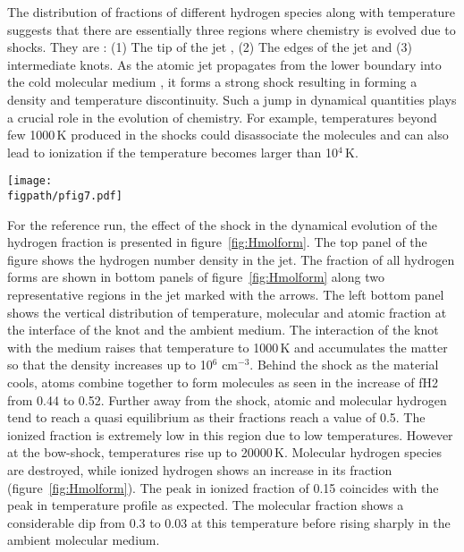 \documentclass[useAMS,usenatbib]{mn2e}
\newcommand{\figpath}{/home/phybva/SiOJets_New/PAPER/NEWFIGS}
\begin{document}
The distribution of fractions of different hydrogen species along with
temperature suggests that there are essentially three regions where
chemistry is evolved due to shocks.
They are : (1) The tip of the jet , (2) The edges of the jet and
(3) intermediate knots. 
As the atomic jet propagates from the lower boundary 
into the cold molecular medium , it forms a strong shock resulting in
forming a density and temperature discontinuity. Such a jump in
dynamical quantities plays a crucial role in the evolution of
chemistry. For example, temperatures beyond few 1000\,K produced in the shocks could
disassociate the molecules and can also lead to ionization if
the temperature becomes larger than 10$^{4}$\,K.

%

\begin{figure*}
 \texttt{[image: \\figpath/pfig7.pdf]}%
 \caption{{\it Top}: Number density, n$_{\rm H}$ [cm$^{-3}$], obtained from the reference 
 run along with labels of typical jet features. {\it Bottom}: Dependence of hydrogen fractions on the temperature at two
  points in the flow, viz. the interface of the knot {\it left} with molecular
 medium and at the bow shock {\it right}.}
\label{fig:Hmolform}
\end{figure*}

For the reference run, the effect of the shock in the dynamical evolution of
the hydrogen fraction is presented in figure~\ref{fig:Hmolform}. The top
panel of the figure shows the hydrogen number density in the jet. 
The fraction of all hydrogen forms are shown in bottom
panels of figure~\ref{fig:Hmolform} along two representative regions in
the jet marked with the arrows. The left bottom panel shows the
vertical distribution of temperature, molecular and atomic fraction at the
interface of the knot and the ambient medium. The interaction of the
knot with the medium raises that temperature to 1000\,K and
accumulates the matter so that the density increases up to
10$^{6}$ cm$^{-3}$. Behind the shock as the material cools, atoms
combine together to form molecules as seen in the increase of fH2 from
0.44 to 0.52. Further away from the
shock, atomic and molecular hydrogen tend to reach a quasi equilibrium as their
fractions reach a value of 0.5. The ionized fraction is
extremely low in this region due to low temperatures. However at the
bow-shock, temperatures rise up to 20000\,K. Molecular
hydrogen species are destroyed, while ionized hydrogen shows an
increase in its fraction 
(figure~\ref{fig:Hmolform}). The peak in ionized fraction of 0.15
coincides with the peak in temperature profile as expected. The
molecular fraction shows a considerable dip from 0.3 to 0.03 at 
this temperature before rising sharply in the ambient molecular
medium. 
%
\end{document}
